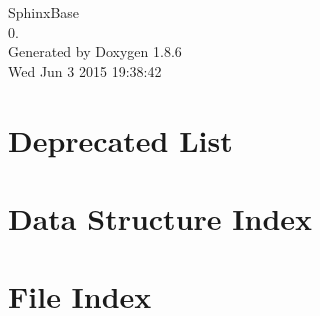 \documentclass[twoside]{book}
\newcommand{\clearemptydoublepage}{%
  \newpage{\pagestyle{empty}\cleardoublepage}%
}
\begin{document}
\begin{titlepage}
\vspace*{7cm}
\begin{center}%
{\Large Sphinx\-Base \\[1ex]\large 0. }\\
\vspace*{1cm}
{\large Generated by Doxygen 1.8.6}\\
\vspace*{0.5cm}
{\small Wed Jun 3 2015 19:38:42}\\
\end{center}
\end{titlepage}
\clearemptydoublepage
\tableofcontents
\clearemptydoublepage
{}

\chapter{Deprecated List}
\label{deprecated}

\chapter{Data Structure Index}

\chapter{File Index}

\end{document}
